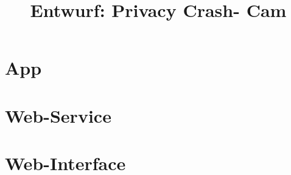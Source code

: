 \documentclass[a4paper,twoside,BCOR=20mm]{scrreprt}
\title{Entwurf: Privacy Crash- Cam}
\begin{document}

\tableofcontents
\newpage



\chapter{App} \label{chap:app}


\newpage

\newpage


\chapter{Web-Service} \label{chap:service}






\chapter{Web-Interface} \label{chap:interface}






\end{document}
